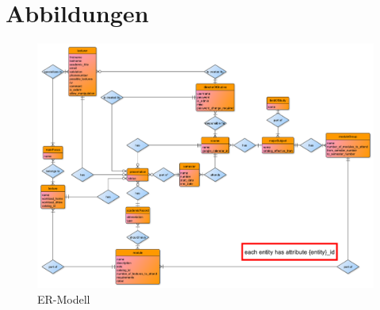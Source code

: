 \chapter{Abbildungen}
\begin{figure}[h]
	\centering 
	\includegraphics[angle={90}, width=\textwidth]{img/er-model.pdf}
	\captionsetup{format=hang}
	\caption[Entity-Relationship-Modell]{\label{fig:ermodell}ER-Modell}
\end{figure}


